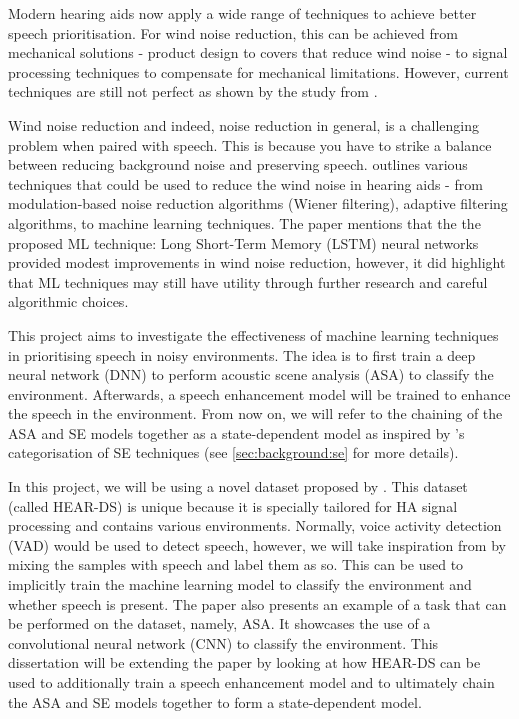 \documentclass[logo,bsc,singlespacing,parskip,online]{infthesis}
\begin{document}
Modern hearing aids now apply a wide range of techniques to achieve 
better speech prioritisation. For wind noise reduction, this can be achieved 
from mechanical solutions - product design to covers that reduce wind noise - to 
signal processing techniques to compensate for mechanical limitations.
However, current techniques are still not perfect as shown by the study from \citet{Kochkin2010MarkeTrak8}.

Wind noise reduction and indeed, noise reduction in general, is a challenging problem
when paired with speech. This is because you have 
to strike a balance between reducing background noise and
preserving speech. 
\citet{Korhonen2021WindNoise} outlines 
various techniques that could be used to reduce the wind noise in hearing aids -
from modulation-based noise reduction algorithms (Wiener filtering),
adaptive filtering algorithms, to machine learning techniques.
The paper mentions that the the proposed ML technique:
Long Short-Term Memory (LSTM) neural networks provided
modest improvements in wind noise reduction, however, it did highlight
that ML techniques may still have utility through further research 
and careful algorithmic choices. 

This project aims to investigate the effectiveness of machine learning techniques 
in prioritising speech in noisy environments. The idea is to 
first train a deep neural network (DNN) to perform acoustic scene analysis (ASA) to classify the environment.
Afterwards, a speech enhancement model will be trained to enhance the speech in the environment.
From now on, we will refer to the chaining of the ASA and SE models together as a state-dependent model
as inspired by \citet{katagiri_handbook_2000}'s categorisation of SE techniques (see \ref{sec:background:se} for more details).

In this project, we will be using a novel dataset proposed by \citet{Huwel2020HearDS}.
This dataset (called HEAR-DS) is unique because it is specially tailored for HA signal processing and contains
various environments. Normally, voice activity detection (VAD) would be 
used to detect speech, however, we will take inspiration from \citet{Huwel2020HearDS}
by mixing the samples with speech and label them as so. 
This can be used to implicitly train the machine learning model to classify the environment 
and whether speech is present.
The paper also presents an example of a task that can be performed on the dataset, 
namely, ASA. It showcases the use of a convolutional neural network (CNN) to classify the environment.
This dissertation will be extending the paper by looking at how HEAR-DS can be used 
to additionally train a speech enhancement model 
and to ultimately chain the ASA and SE models together to form a state-dependent model.
\end{document}
